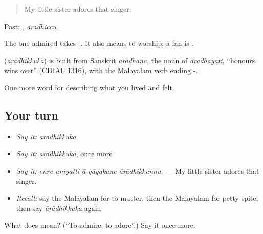 \begin{quote}
My little sister adores that singer.
\end{quote}

Past: , \emph{ārādhiccu}.

The one admired takes -. It also means to worship; a fan is .

\begin{cousinweb}
\textbf{} (\emph{ārādhikkuka}) is built from Sanskrit \emph{ārādhana}, the noun of \emph{ārādhayati}, \textquotedblleft{}honours, wins over\textquotedblright{} (CDIAL 1316), with the Malayalam verb ending -.
\end{cousinweb}

\begin{grammarlens}[title={What you've built}]
One more word for describing what you lived and felt.
\end{grammarlens}

\subsection*{Your turn}
\begin{itemize}
\raggedright
  \item \emph{Say it:} \emph{ārādhikkuka}
  \item \emph{Say it:} \emph{ārādhikkuka}, once more
  \item \emph{Say it:} \emph{enṟe aniyatti ā gāyakane ārādhikkunnu.} — My little sister adores that singer.
  \item \emph{Recall:} say the Malayalam for to mutter, then the Malayalam for petty spite, then say \emph{ārādhikkuka} again
\end{itemize}

\begin{tcolorbox}[breakable,colback=teal!4,colframe=teal!35!black,title={Before you move on}]
What does  mean? (\textquotedblleft{}To admire; to adore\textquotedblright{}.) Say it once more.
\end{tcolorbox}
